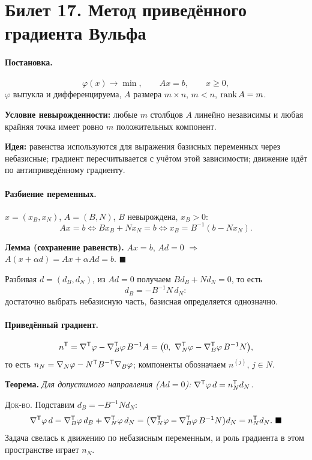 \section{Билет 17. Метод приведённого градиента Вульфа}


\paragraph{Постановка.}
\[
  \varphi(x) \to \min , \qquad Ax = b , \qquad x \ge 0 ,
\]
$\varphi$ выпукла и дифференцируема, $A$ размера $m\times n$, $m < n$,
$\operatorname{rank} A = m$.

\textbf{Условие невырожденности:} любые $m$ столбцов $A$ линейно независимы и
любая крайняя точка имеет ровно $m$ положительных компонент.

\textbf{Идея:} равенства используются для выражения базисных переменных через
небазисные; градиент пересчитывается с учётом этой зависимости; движение идёт
по антиприведённому градиенту.

\paragraph{Разбиение переменных.}
$x = (x_B, x_N)$, $A = (B,N)$, $B$ невырождена, $x_B > 0$:
\[
  Ax = b \iff Bx_B + Nx_N = b \iff x_B = B^{-1}(b - Nx_N) .
\]

\textbf{Лемма (сохранение равенств).} $Ax = b$, $Ad = 0$ $\Rightarrow$
$A(x+\alpha d) = Ax + \alpha Ad = b$. $\blacksquare$

Разбивая $d = (d_B, d_N)$, из $Ad = 0$ получаем $Bd_B + Nd_N = 0$, то есть
\[
  d_B = -B^{-1}N\,d_N :
\]
достаточно выбрать небазисную часть, базисная определяется однозначно.

\paragraph{Приведённый градиент.}
\[
  n^{\mathsf{T}} = \nabla^{\mathsf{T}}\varphi - \nabla_B^{\mathsf{T}}\varphi\,B^{-1}A
      = \big(0,\ \nabla_N^{\mathsf{T}}\varphi - \nabla_B^{\mathsf{T}}\varphi\,B^{-1}N\big) ,
\]
то есть $n_N = \nabla_N\varphi - N^{\mathsf{T}} B^{-\mathsf{T}}\nabla_B\varphi$;
компоненты обозначаем $n^{(j)}$, $j \in N$.

\textbf{Теорема.} \textit{Для допустимого направления ($Ad = 0$):}
$\nabla^{\mathsf{T}}\varphi\,d = n_N^{\mathsf{T}} d_N$.

\textsc{Док-во.} Подставим $d_B = -B^{-1}Nd_N$:
\[
  \nabla^{\mathsf{T}}\varphi\,d
   = \nabla_B^{\mathsf{T}}\varphi\,d_B + \nabla_N^{\mathsf{T}}\varphi\,d_N
   = \big(\nabla_N^{\mathsf{T}}\varphi - \nabla_B^{\mathsf{T}}\varphi\,B^{-1}N\big)d_N
   = n_N^{\mathsf{T}} d_N . \ \blacksquare
\]
Задача свелась к движению по небазисным переменным, и роль градиента в этом
пространстве играет $n_N$.

